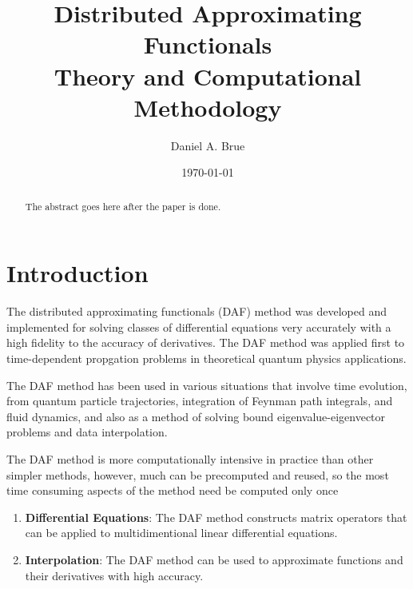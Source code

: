 \documentclass[preprint]{revtex4}
\begin{document}
\title{%
    Distributed Approximating Functionals\\
    {\small Theory and Computational Methodology}\\
}
\author{Daniel A. Brue}
\date{\today}

\begin{abstract}
The abstract goes here after the paper is done.
\end{abstract}

\maketitle

\section{Introduction}
The distributed approximating functionals (DAF) method was developed 
and implemented for solving classes of differential equations very accurately
with a high fidelity to the accuracy of derivatives. 
The DAF method was applied first to time-dependent propgation problems in theoretical
quantum physics applications\cite{Kouri-DAF1,Kouri-DAF2,Kouri-DAF3,Kouri-DAF4,
Kouri-DAF5,Kouri-DAF6,Kouri-DAF7}.

The DAF method has been used in various situations that involve time evolution, 
from quantum particle trajectories\cite{QTM}, integration of Feynman path integrals\cite{DAF-Szalay1},
and fluid dynamics\cite{NVS,Burgers}, and also as a method of solving bound eigenvalue-eigenvector
problems\cite{DAF-Szalay2,SGWD} and data interpolation\cite{DAF-Szalay3}.

The DAF method is more computationally intensive in practice than other simpler methods, 
however, much can be precomputed and reused, so the most time consuming aspects of the
method need be computed only once 

\begin{enumerate}
\item{\bf Differential Equations}: The DAF method constructs matrix operators that
	can be applied to multidimentional linear differential equations. 
\item{\bf Interpolation}: The DAF method can be used to approximate functions and
	their derivatives with high accuracy. 
\end{enumerate}
\end{document}
